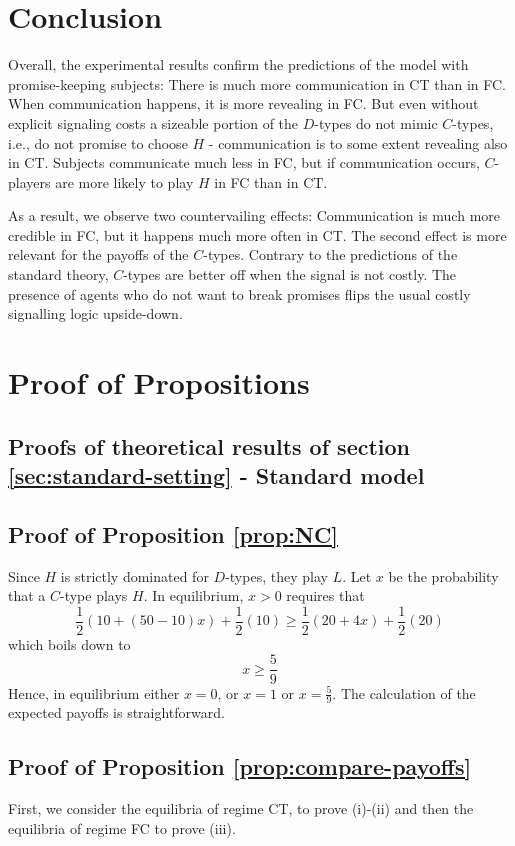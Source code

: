 \documentclass[12pt]{article}
\theoremstyle{break}
\begin{document}
\section{Conclusion}
Overall, the experimental results confirm the predictions of the model with promise-keeping subjects: There is much more communication in CT than in FC. When communication happens, it is more revealing in FC. But even without explicit signaling costs a sizeable portion of the $D$-types do not mimic $C$-types, i.e., do not promise to choose $H$ - communication is to some extent revealing also in CT. Subjects communicate much less in FC, but if communication occurs, $C$-players are more likely to play $H$ in FC than in CT.


As a result, we observe two countervailing effects: Communication is much more credible in FC, but it happens much more often in CT. The second effect is more relevant for the payoffs of the $C$-types. Contrary to the predictions of the standard theory, $C$-types are better off when the signal is not costly. The presence of agents who do not want to break promises flips the usual costly signalling logic upside-down.




%   
%    
\appendix
\section{Proof of Propositions}
\subsection{Proofs of theoretical results of section \ref{sec:standard-setting} - Standard model}
\subsection*{Proof of Proposition \ref{prop:NC}}
Since $H$ is strictly dominated for $D$-types, they play $L$. Let $x$ be the probability that a $C$-type plays $H$. In equilibrium, $x>0$ requires that
\[
	\frac{1}{2}(10+(50-10)x)+\frac{1}{2}(10)\geq \frac{1}{2}(20+4 x)+\frac{1}{2}(20)
\]
which boils down to\[
x\geq \frac{5}{9}
	\]
Hence, in equilibrium either $x=0$, or $x=1$ or $x=\frac{5}{9}$. The calculation of the expected payoffs is straightforward. 


\subsection*{Proof of Proposition \ref{prop:compare-payoffs}}
First, we consider the equilibria of regime CT, to prove (i)-(ii) and then the equilibria of regime FC to prove (iii).
%
\end{document}
